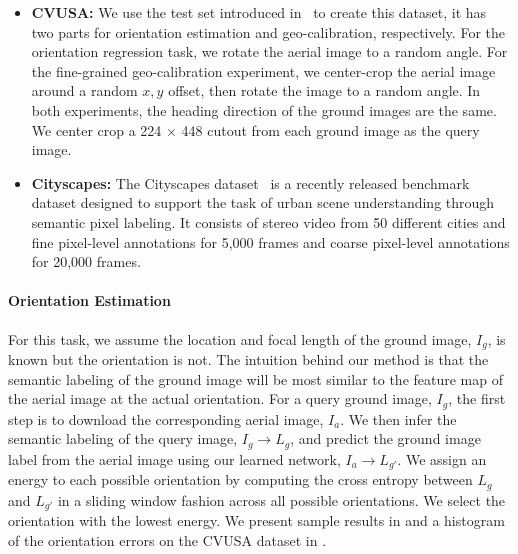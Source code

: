 \begin{itemize}

\item{\textbf{CVUSA:}} We use the test set introduced
in~ to create this dataset, it has two parts for
orientation estimation and geo-calibration, respectively.  For the
orientation regression task, we rotate the aerial image to a random
angle. For the fine-grained geo-calibration experiment, we center-crop
the aerial image around a random $x,y$ offset, then rotate the image to a
random angle.  In both experiments, the heading direction of the
ground images are the same. We center crop a 224 $\times$ 448
cutout from each ground image as the query image.

\item{\textbf{Cityscapes:}}  The Cityscapes dataset~\cite{Cordts2016Cityscapes} 
is a recently released benchmark dataset designed to support the task
of urban scene understanding through semantic pixel labeling. It
consists of stereo video from 50 different cities and fine pixel-level
annotations for 5,000 frames and coarse pixel-level annotations for
20,000 frames. 

\end{itemize}

\paragraph{Orientation Estimation}

For this task, we assume the location and focal length of the ground
image, $I_g$, is known but the orientation is not. The intuition
behind our method is that the semantic labeling of the ground image
will be most similar to the feature map of the aerial image at the
actual orientation.  For a query ground image, $I_g$, the first step
is to download the corresponding aerial image, $I_a$.  We then infer
the semantic labeling of the query image, $I_g \rightarrow L_g$, and
predict the ground image label from the aerial image using our learned
network, $I_a \rightarrow L_{g'}$.  We assign an energy to each
possible orientation by computing the cross entropy between $L_g$ and
$L_{g'}$ in a sliding window fashion across all possible orientations.
We select the orientation with the lowest energy.  We present sample results in 
 and a histogram of the orientation errors on the 
CVUSA dataset in .




